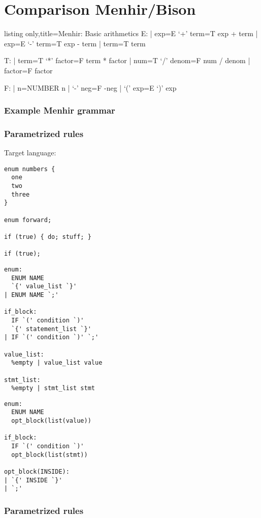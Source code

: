 \section{Comparison Menhir/Bison}
\setcounter{subsection}{1}

\begin{lrbox}{\codebox}
  \begin{tcblisting}{listing only,title=Menhir: Basic arithmetics}
E:
| exp=E `+' term=T     { exp + term }
| exp=E `-' term=T     { exp - term }
| term=T               { term       }

T:
| term=T `*' factor=F  { term * factor }
| num=T `/' denom=F    { num / denom   }
| factor=F             { factor        }

F:
| n=NUMBER             { n    }
| `-' neg=F            { -neg }
| `(' exp=E `)'        { exp  }
  \end{tcblisting}
\end{lrbox}
\begin{frame}
\frametitle{Example Menhir grammar}
  \usebox{\codebox}
\end{frame}

\begin{frame}[fragile]
  \frametitle{Parametrized rules}
  Target language:
  \begin{verbatim}
enum numbers {
  one
  two
  three
}

enum forward;

if (true) { do; stuff; }

if (true);
\end{verbatim}
\end{frame}

\lstset{basicstyle=\ttfamily\scriptsize}
\begin{lrbox}{\codebox}
  \begin{tcolorbox}[title=\centering{Parametrized rules}\\Bison\hspace{0.45\linewidth} Menhir,sidebyside]%
  \begin{lstlisting}
enum:
  ENUM NAME
  `{' value_list `}'
| ENUM NAME `;'

if_block:
  IF `(' condition `)'
  `{' statement_list `}'
| IF `(' condition `)' `;'

value_list:
  %empty | value_list value

stmt_list:
  %empty | stmt_list stmt
\end{lstlisting}
\tcblower%
  \begin{lstlisting}
enum:
  ENUM NAME
  opt_block(list(value))

if_block:
  IF `(' condition `)'
  opt_block(list(stmt))

opt_block(INSIDE):
| `{' INSIDE `}'
| `;'
  \end{lstlisting}
  \end{tcolorbox}
\end{lrbox}
\begin{frame}
  \frametitle{Parametrized rules}
  \usebox{\codebox}
\end{frame}

